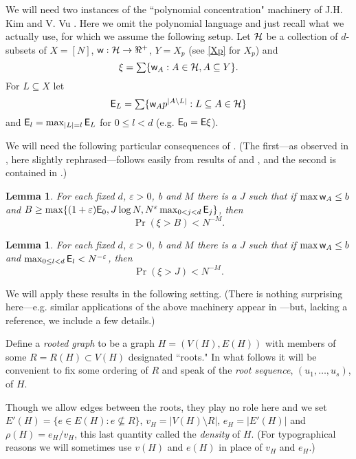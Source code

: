 \documentclass[letterpaper,11pt]{article}
\newtheorem{lemma}[thm]{Lemma}
\newcommand{\beq}[1]{\begin{equation}\label{#1}}
\newcommand{\enq}[0]{\end{equation}}
\newcommand{\mn}[0]{\medskip\noindent}
\newcommand{\sub}[0]{\subseteq}
\newcommand{\sm}[0]{\setminus}
\renewcommand{\dots}[0]{,\ldots,}
\newcommand{\h}[0]{{\cal H}}
\newcommand{\ra}[0]{\rightarrow}
\newcommand{\ww}{\mbox{{\sf w}}}
\newcommand{\0}[0]{\emptyset}
\newcommand{\eps}[0]{\varepsilon }
\begin{document}
\mn
We will need two instances of the ``polynomial
concentration" machinery of J.H. Kim and V. Vu
\cite{KimVu,Vu,Vu2}.
Here we omit the polynomial
language and just recall what we actually use, for which
we assume the following setup.
%
Let $\h$ be a collection of $d$-subsets of $X=[N]$,
$\ww:\h\ra \Re^+$,
$Y=X_p$
(see
\eqref{Xp} for $X_p$)
and
\beq{xipoly}\mbox{$\xi = \sum\{\ww_A:A\in \h,A\sub Y\}$.}
\enq
For $L\sub X$ let
\[
\mbox{$\E_L =\sum\{\ww_Ap^{|A\sm L|}:L\sub A\in \h\}$}
\]
and
${\sf E}_l =\max_{|L|=l}{\sf E}_L$ for $0\leq l<d$
(e.g. ${\sf E}_0={\sf E}\xi$).

We will need the following particular consequences of \cite{KimVu,Vu2,Vu}.
(The first---as observed in \cite[Cor. 5.5]{JKV}, here slightly rephrased---follows
easily from results of \cite{KimVu} and \cite{Vu2}, and the second
is contained in
\cite[Cor. 2.6]{Vu}.)

%
\begin{lemma}\label{VuL1}
For each fixed $d$, $\eps>0$, b and $M$ there is a $J$
such that
if
$\max \ww_A\leq b$ and
$B\geq\max \{(1+\eps)\E_0,J \log N, N^\eps \max_{0<j<d}\E_j\}$,
then
\[\Pr(\xi >B)< N^{-M}.\]
\end{lemma}

\begin{lemma}\label{VuL2}
For each fixed $d$, $\eps>0$, b and $M$ there is a $J$
such that
if $\max \ww_A\leq b$ and
$\max_{0\leq l<d}\E_l < N^{-\eps}$, then
\[\Pr(\xi >J)< N^{-M}.\]
\end{lemma}


We will apply these results in the following setting.
(There is nothing surprising here---e.g. similar applications
of the above machinery appear in \cite{JKV}---but,
lacking a reference, we include a few details.)

Define a {\em rooted graph} to be a graph $H=(V(H),E(H))$
with members of some $R=R(H)\subset V(H)$ designated ``roots."
In what follows it will be convenient to fix
some ordering
of $R$ and speak of the {\em root sequence}, $(u_1\dots u_s)$,
of $H$.

Though
we allow edges between the roots, they play no role here
and we set $E'(H)=\{e\in E(H):e\not\sub R\}$,
$v_H=|V(H)\sm R|$, $e_H=|E'(H)|$
and $\rho(H) = e_H/v_H$, this last quantity
called the {\em density} of $H$.
(For typographical reasons we will sometimes use $v(H)$ and $e(H)$
in place of $v_H$ and $e_H$.)
\end{document}
